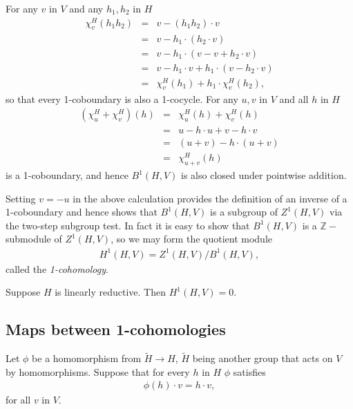 For any $v$ in $V$ and any $h_1, h_2$ in $H$
\begin{eqnarray*}
	\chi^H_v(h_1h_2) &=& v - (h_1h_2)\cdot v \\
	&=& v - h_1 \cdot \left(h_2\cdot v \right)\\
	&=& v - h_1 \cdot \left(v -v + h_2\cdot v \right)\\
	&=& v - h_1\cdot v + h_1\cdot \left( v - h_2\cdot v\right)\\
	&=& \chi^H_v(h_1) + h_1\cdot \chi^H_v(h_2),
\end{eqnarray*}
so that every 1-coboundary is also a 1-cocycle. For any $u,v$ in $V$ and all $h$ in $H$
\begin{eqnarray*}
	(\chi^H_u + \chi^H_v)(h) &=& \chi^H_u(h) + \chi^H_v(h)\\
	&=& u - h\cdot u + v - h\cdot v \\
	&=& (u + v) - h\cdot (u + v) \\
	&=& \chi^H_{u + v} (h)
\end{eqnarray*}
is a 1-coboundary, and hence $B^1\left(H, V\right)$ is also closed under pointwise addition.

Setting $v = -u$ in the above calculation provides the definition of an inverse of a 1-coboundary and hence shows that $B^1(H, V)$ is a subgroup of $Z^1(H, V)$ via the two-step subgroup test. In fact it is easy to show that $B^1(H, V)$ is a $\mathbb{Z}-$submodule of $Z^1(H, V)$, so we may form the quotient module
\begin{eqnarray*}
	H^1\left(H, V\right) = Z^1\left(H, V\right) / B^1\left(H, V\right),
\end{eqnarray*}
called the \emph{1-cohomology}.
\begin{lemma} Suppose $H$ is linearly reductive. Then $H^1(H, V) = 0$.
\end{lemma}

\subsection{Maps between 1-cohomologies}
Let $\phi$ be a homomorphism from $\tilde{H}\rightarrow H$, $\tilde{H}$ being another group that acts on $V$ by homomorphisms. Suppose that for every $h$ in $H$ $\phi$ satisfies
\begin{eqnarray*}
	\phi(h)\cdot v = h\cdot v,
\end{eqnarray*}
for all $v$ in $V$.

